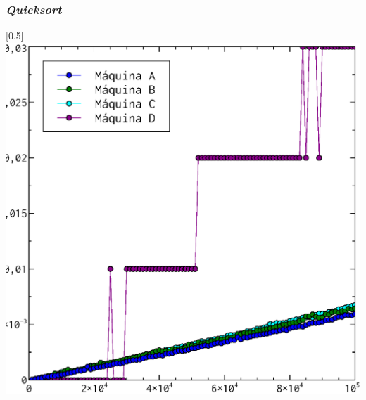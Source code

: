 \documentclass[compress]{beamer}
\begin{document}
\begin{frame}
\frametitle{\textit{Quicksort}}
	\begin{center}
\scalebox{0.53}[0.5]{
    \includegraphics[]{quicksort_todos.eps}
}
\end{center}
\end{frame}
\end{document}
